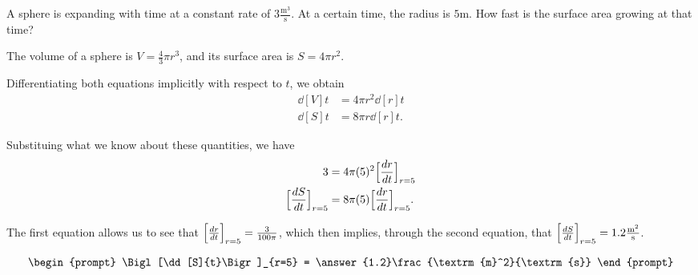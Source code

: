 \documentclass{ximera}
\author{Steven Gubkin}
\begin{document}
\begin{exercise}

A sphere is expanding with time at a constant rate of $3
\frac{\textrm{m}^3}{\textrm{s}}$.  At a certain time, the radius is $5
\textrm{m}$.  How fast is the surface area growing at that time?

\begin{hint}
  The volume of a sphere is $V = \frac{4}{3} \pi r^3$, and its surface area is $S = 4 \pi r^2$.
\end{hint}

\begin{hint}
  Differentiating  both equations implicitly with respect to $t$, we obtain
\begin{align*}
\dd[V]{t} &= 4 \pi r^2 \dd[r]{t} \\
\dd[S]{t} &= 8\pi r \dd[r]{t}.
\end{align*}
\end{hint}

\begin{hint}
	Substituing what we know about these quantities, we have
\begin{align*}
3 &= 4 \pi (5)^2 \Bigl[\dd[r]{t}\Bigr]_{r=5} \\
\Bigl[\frac{\d S}{\d t}\Bigr]_{r=5} &= 8\pi (5)\Bigl[\dd[r]{t}\Bigr]_{r=5}.
\end{align*}
\end{hint}

\begin{hint}
  The first equation allows us to see that $\Bigl[\dd[r]{t}\Bigr]_{r=5} =
  \frac{3}{100 \pi}$, which then implies, through the second equation,
  that $\Bigl[\dd[S]{t}\Bigr]_{r=5} = 1.2\frac{\textrm{m}^2}{\textrm{s}}$.
\end{hint}


\[
\begin{prompt}
	\Bigl[\dd[S]{t}\Bigr]_{r=5}  = \answer{1.2}\frac{\textrm{m}^2}{\textrm{s}}
\end{prompt}
\]

\end{exercise}
\end{document}
